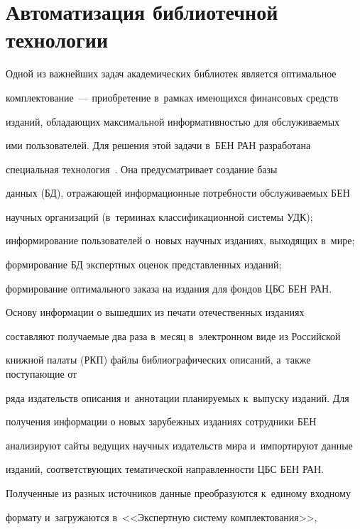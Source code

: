   


\section{Автоматизация библиотечной технологии}





  Одной из важнейших задач академических библиотек является оптимальное 


комплектование~--- приобретение в~рамках имеющихся финансовых средств 


изданий, об\-ла\-да\-ющих максимальной информативностью для обслуживаемых 


ими пользователей. Для решения этой задачи в~БЕН РАН разработана 


специальная технология~\cite{6-vla, 7-vla}. Она предусматривает создание базы 


данных (БД), от\-ра\-жа\-ющей информационные потребности обслуживаемых БЕН 


научных организаций (в~терминах классификационной системы УДК); 


информирование пользователей о~новых научных изданиях, выходящих в~мире; 


формирование БД экспертных оценок представленных изданий; 


формирование оптимального заказа на издания для фондов ЦБС БЕН РАН. 


  


  Основу информации о вышедших из печати отечественных изданиях 


со\-став\-ля\-ют получаемые два раза в~месяц в~электронном виде из Российской 


книжной палаты (РКП) файлы библиографических описаний, а~также поступающие от 


ряда издательств описания и~аннотации планируемых к~выпуску изданий. Для 


получения информации о новых зарубежных изданиях сотрудники БЕН 


анализируют сайты ведущих научных издательств мира и~импортируют данные 


изданий, соответствующих тематической направленности ЦБС БЕН РАН. 


Полученные из разных источников данные преобразуются к~единому входному 


формату и~загружаются в~<<Экспертную систему комплектования>>, 


